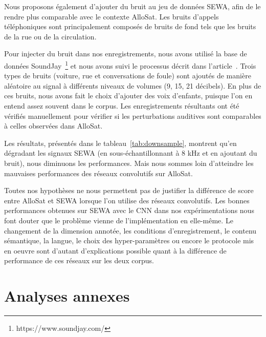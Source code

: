 Nous proposons également d'ajouter du bruit au jeu de données SEWA, afin de le rendre plus comparable avec le contexte AlloSat. Les bruits d'appels téléphoniques sont principalement composés de bruits de fond tels que les bruits de la rue ou de la circulation.

Pour injecter du bruit dans nos enregistrements, nous avons utilisé la base de données SoundJay~\footnote{https://www.soundjay.com/} et nous avons suivi le processus décrit dans l'article~\cite{Alzqhoul2016}. Trois types de bruits (voiture, rue et conversations de foule) sont ajoutés de manière aléatoire au signal à différents niveaux de volumes (9, 15, 21 décibels). En plus de ces bruits, nous avons fait le choix d'ajouter des voix d'enfants, puisque l'on en entend assez souvent dans le corpus. Les enregistrements résultants ont été vérifiés manuellement pour vérifier si les perturbations auditives sont comparables à celles observées dans AlloSat.



Les résultats, présentés dans le tableau~\ref{tab:downsample}, montrent qu'en dégradant les signaux SEWA (en sous-échantillonnant à 8 kHz et en ajoutant du bruit), nous diminuons les performances. Mais nous sommes loin d'atteindre les mauvaises performances des réseaux convolutifs sur AlloSat.

Toutes nos hypothèses ne nous permettent pas de justifier la différence de score entre AlloSat et SEWA lorsque l'on utilise des réseaux convolutifs. Les bonnes performances obtenues sur SEWA avec le CNN dans nos expérimentations nous font douter que le problème vienne de l'implémentation en elle-même. Le changement de la dimension annotée, les conditions d'enregistrement, le contenu sémantique, la langue, le choix des hyper-paramètres ou encore le protocole mis en oeuvre sont d'autant d'explications possible quant à la différence de performance de ces réseaux sur les deux corpus.

\section{Analyses annexes}

